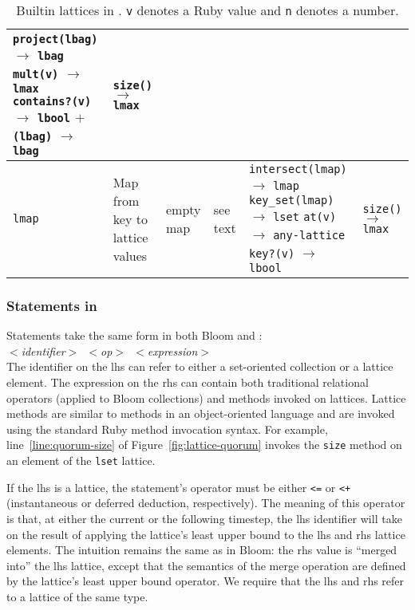 \begin{table*}[t]
\begin{center}
\begin{tabular}{|l|l|l|l|p{1.57in}|p{1.09in}|}
\texttt{project(lbag)} $\to$ \texttt{lbag}\newline
\texttt{mult(v)} $\to$ \texttt{lmax}\newline
\texttt{contains?(v)} $\to$ \texttt{lbool}\newline
\texttt{$\mathtt{+}$(lbag)} $\to$ \texttt{lbag}
& \texttt{size()} $\to$ \texttt{lmax}\\
\hline
\texttt{lmap} & Map from key to lattice values & empty map & see text&
\texttt{intersect(lmap)} $\to$ \texttt{lmap}\newline
\texttt{key\_set(lmap)} $\to$ \texttt{lset}\newline
\texttt{at(v)} $\to$ \texttt{any-lattice}\newline
\texttt{key?(v)} $\to$ \texttt{lbool}
& \texttt{size()} $\to$ \texttt{lmax}\\
\hline
\end{tabular}
\caption{Builtin lattices in \lang. \texttt{v} denotes a Ruby value and
  \texttt{n} denotes a number.}
\label{tbl:builtin-lattices}
\end{center}
\end{table*}


\subsubsection{Statements in \lang}
Statements take the same form in both Bloom and \lang: \\ \noindent
\mbox{\hspace{0.25in}\emph{$<$identifier$>$ $<$op$>$
    $<$expression$>$}}\\ \noindent
The identifier on the lhs can refer to either a set-oriented collection or a
lattice element. The expression on the rhs can contain both traditional
relational operators (applied to Bloom collections) and methods invoked on
lattices.  Lattice methods are similar to methods in an object-oriented language
and are invoked using the standard Ruby method invocation syntax. For example,
line~\ref{line:quorum-size} of Figure~\ref{fig:lattice-quorum} invokes the
\texttt{size} method on an element of the \texttt{lset} lattice.

If the lhs is a lattice, the statement's operator must be either \verb|<=| or
\verb|<+| (instantaneous or deferred deduction, respectively). The meaning of
this operator is that, at either the current or the following timestep, the lhs
identifier will take on the result of applying the lattice's least upper bound
to the lhs and rhs lattice elements. The intuition remains the same as in Bloom:
the rhs value is ``merged into'' the lhs lattice, except that the semantics of
the merge operation are defined by the lattice's least upper bound operator. We
require that the lhs and rhs refer to a lattice of the same type.

